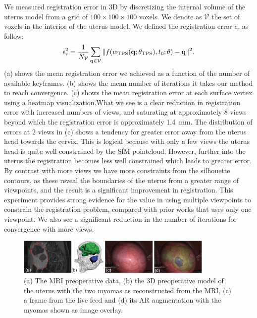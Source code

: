 We measured registration error in 3D by discretizing the internal volume of the uterus model from a grid of $100\times 100 \times 100$ voxels. We denote as $\mathcal{V}$ the set of voxels in the interior of the uterus model. We defined the registration error $\epsilon_r$ as follow:
\begin{equation}
  \label{eq:regerror}
  \epsilon^2_r=\frac{1}{N_{\mathcal{V}}}\sum_{\mathbf{q}\in \mathcal{V}} \|f(\wTPS(\mathbf{q};\thetaTPS),t_0;\theta)-\mathbf{q}\|^2. 
\end{equation}
\noindent {}(a) shows the mean registration error we achieved as a function of the number of available keyframes. (b) shows the mean number of iterations it takes our method to reach convergence. (c) shows the mean registration error at each surface vertex using a heatmap visualization.What we see is a clear reduction in registration error with increased numbers of views, and saturating at approximately $8$ views beyond which the registration error is approximately \SI{1.4}{\milli\metre}. The distribution of errors at $2$ views in (c) shows a tendency for greater error away from the uterus head towards the cervix. This is logical because with only a few views the uterus head is quite well constrained by the SfM pointcloud. However, further into the uterus the registration becomes less well constrained which leads to greater error.
By contrast with more views we have more constraints from the silhouette contours, as these reveal the boundaries of the uterus from a greater range of viewpoints, and the result is a significant improvement in registration. This experiment provides strong evidence for the value in using multiple viewpoints to constrain the registration problem, compared with prior works that uses only one viewpoint. We also see a significant reduction in the number of iterations for convergence with more views.

\begin{figure}[t]
  \centering
  \includegraphics[width=0.85\textwidth]{./figs/introFig.pdf}
\caption{(a) The MRI preoperative data, (b) the 3D preoperative model of the uterus with the two myomas as reconstructed from the MRI, (c) a frame from the live feed and (d) its AR augmentation with the myomas shown as image overlay.}
\label{fig:myomas}
\end{figure}

